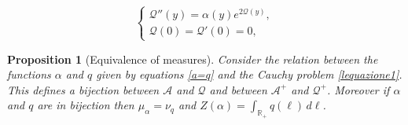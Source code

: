 \documentclass[10pt,a4paper]{amsart}
\newtheorem{proposition}{Proposition}
\newcommand{\RR}{\mathbb R}
\begin{document}
	\begin{equation}\label{lequazione1}
		\left\{
		\begin{array}{l}
			\mathcal Q''(y)=\alpha(y) e^{2\mathcal Q(y)}, \\
			\mathcal Q(0)=\mathcal Q'(0)=0,
		\end{array}
		\right.
	\end{equation}

\begin{proposition}[Equivalence of measures]
	\label{eqm9}
	Consider the relation  between the functions $\alpha$ and $q$ given by equations \eqref{a=q} and the Cauchy problem \eqref{lequazione1}.
	This defines a bijection between $\mathcal A$ and $\mathscr Q$ and between $\mathcal A^+$ and $\mathscr Q^+$. Moreover if $\alpha$ and $q$ are in bijection then 
	$ \mu_\alpha=\nu_q$ and $Z(\alpha)=\int_{\RR_+} q(\ell)\, d\ell$.
\end{proposition}
\end{document}
